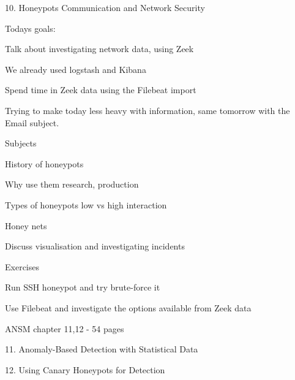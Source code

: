 \documentclass[Screen16to9,17pt]{foils}
\begin{document}
\mytitlepage
{10. Honeypots}
{Communication and Network Security \the\year}





Todays goals:
\begin{list2}
\item Talk about investigating network data, using Zeek
\item We already used logstash and Kibana
\item Spend time in Zeek data using the Filebeat import
\end{list2}

Trying to make today less heavy with information, same tomorrow with the Email subject. 




\begin{list1}
\item Subjects
\begin{list2}
\item History of honeypots
\item Why use them research, production
\item Types of honeypots low vs high interaction
\item Honey nets
\item Discuss visualisation and investigating incidents
\end{list2}
\item Exercises
\begin{list2}
\item Run SSH honeypot and try brute-force it
\item Use Filebeat and investigate the options available from Zeek data
\end{list2}
\end{list1}



\begin{list1}
\item ANSM chapter 11,12 - 54 pages
\item 11. Anomaly-Based Detection
with Statistical Data
\item 12. Using Canary Honeypots
for Detection
\end{list1}


\end{document}
